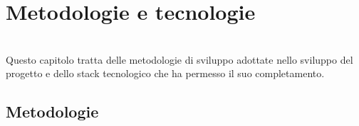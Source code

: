 
\chapter{Metodologie e tecnologie}
\label{cap:metodologie-tecnologie}

\\
Questo capitolo tratta delle metodologie di sviluppo adottate nello sviluppo del progetto e dello stack tecnologico che ha permesso il suo completamento.

\section{Metodologie}

